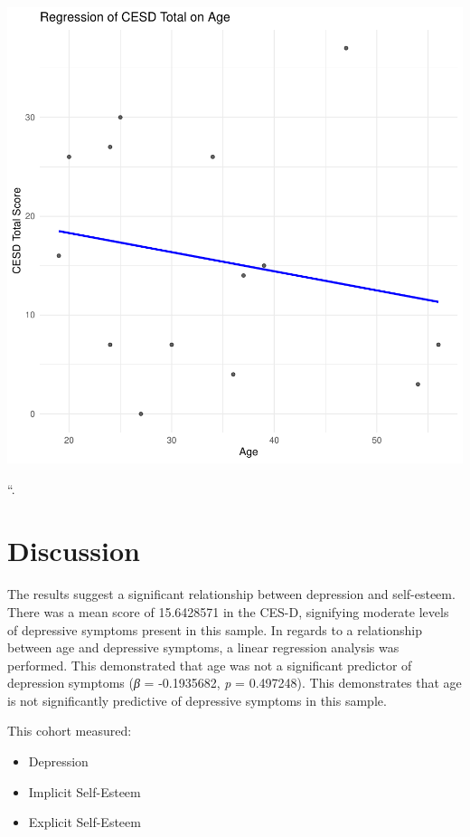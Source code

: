 \documentclass[
  man,
  longtable,
  nolmodern,
  notxfonts,
  notimes,
  colorlinks=true,linkcolor=blue,citecolor=blue,urlcolor=blue]{apa7}
\begin{document}
\includegraphics{SE-SCC-Depression_files/figure-pdf/CESD-total-versus-age-1.pdf}

``.

\section{Discussion}\label{discussion}

The results suggest a significant relationship between depression and
self-esteem. There was a mean score of 15.6428571 in the CES-D,
signifying moderate levels of depressive symptoms present in this
sample. In regards to a relationship between age and depressive
symptoms, a linear regression analysis was performed. This demonstrated
that age was not a significant predictor of depression symptoms
(\emph{β} = -0.1935682, \emph{p} = 0.497248). This demonstrates that age
is not significantly predictive of depressive symptoms in this sample.

This cohort measured:

\begin{itemize}
\item
  Depression
\item
  Implicit Self-Esteem
\item
  Explicit Self-Esteem
\end{itemize}
\end{document}

